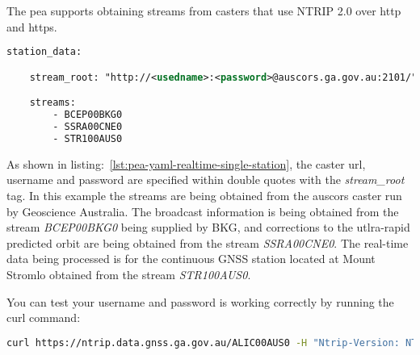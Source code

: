 The pea supports obtaining streams from casters that use NTRIP 2.0 over http and https. 
\begin{lstlisting}[language=xml,caption=yaml input files configuration example]
station_data:

	stream_root: "http://<usedname>:<password>@auscors.ga.gov.au:2101/"

	streams:
		- BCEP00BKG0
		- SSRA00CNE0
		- STR100AUS0
\end{lstlisting}\label{lst:pea-yaml-realtime-single-station}
%
As shown in listing:~\ref{lst:pea-yaml-realtime-single-station}, the caster url, username and password are specified within double quotes with the \emph{stream\_root} tag. In this example the streams are being obtained from the auscors caster run by Geoscience Australia. 
The broadcast information is being obtained from the stream \emph{BCEP00BKG0} being supplied by BKG, and corrections to the utlra-rapid predicted orbit are being obtained from the stream \emph{SSRA00CNE0}. 
The real-time data being processed is for the continuous GNSS station located at Mount Stromlo obtained from the stream \emph{STR100AUS0}.

You can test your username and password is working correctly by running the curl command:
\begin{lstlisting}[language=bash]
curl https://ntrip.data.gnss.ga.gov.au/ALIC00AUS0 -H "Ntrip-Version: NTRIP/2.0" -i  --output - -u <user>
\end{lstlisting}
%
